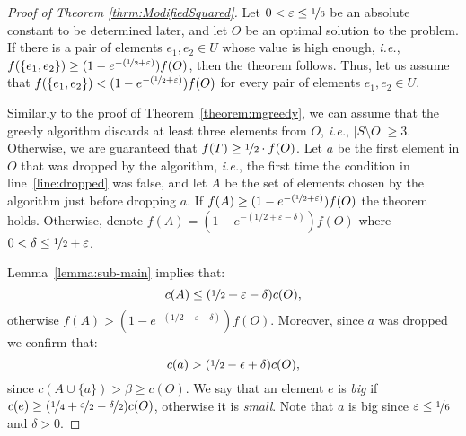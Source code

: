 \begin{proof}[Proof of Theorem \ref{thrm:ModifiedSquared}]
Let $0<\varepsilon \leq \nicefrac[]{1}{6}$ be an absolute constant to be determined later, and let $O$ be an optimal solution to the problem.
If there is a pair of elements $e_1, e_2 \in U$ whose value is high enough, {\em i.e.}, $f(\{e_1, e_2\}) \geq (1 - e^{-(\nicefrac[]{1}{2} + \varepsilon)})f(O)$, then the theorem follows.
Thus, let us assume that $f(\{e_1, e_2\}) < (1 - e^{-(\nicefrac[]{1}{2} + \varepsilon)})f(O)$ for every pair of elements $e_1, e_2 \in U$.

Similarly to the proof of Theorem~\ref{theorem:mgreedy}, we can assume that the greedy algorithm discards at least three elements from $O$, {\em i.e.}, $|S \setminus O| \geq 3$.
Otherwise, we are guaranteed that $f(T) \geq \nicefrac[]{1}{2}\cdot f(O)$.
Let $a$ be the first element in $O$ that was dropped by the algorithm, {\em i.e.}, the first time the condition in line~\ref{line:dropped} was false, and let $A$ be the set of elements chosen by the algorithm just before dropping $a$.
If $f(A) \geq (1 - e^{-(\nicefrac[]{1}{2} + \varepsilon)})f(O)$ the theorem holds.
Otherwise, denote $f(A) = (1 - e^{-(1/2 + \varepsilon - \delta)})f(O)$ where $0 < \delta \leq \nicefrac[]{1}{2} + \varepsilon$.

Lemma~\ref{lemma:sub-main} implies that:
\begin{equation}
	\label{mmgreedy:ineq1}
	c(A) \leq (\nicefrac[]{1}{2} + \varepsilon - \delta)c(O),
\end{equation}
otherwise $f(A) > (1-e^{-(1/2 + \varepsilon - \delta)})f(O)$.
Moreover, since $a$ was dropped we confirm that:
\begin{equation}
	\label{mmgreedy:ineq2}
	c(a) > (\nicefrac[]{1}{2} -\epsilon + \delta)c(O),
\end{equation}
since $c(A \cup \{a\}) > \beta \geq c(O)$.
We say that an element $e$ is \emph{big} if $c(e) \geq (\nicefrac[]{1}{4} + \nicefrac[]{\varepsilon}{2} - \nicefrac[]{\delta}{2})c(O)$,
otherwise it is \emph{small}.
Note that $a$ is big since $\varepsilon \leq \nicefrac[]{1}{6}$ and $\delta > 0$.


\end{proof}
